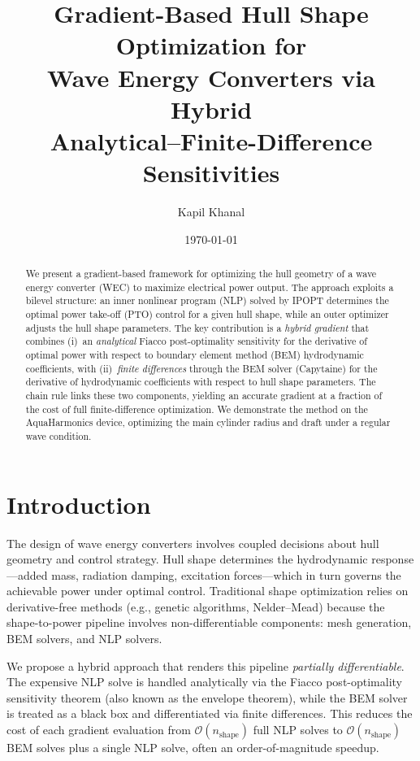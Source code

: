 \documentclass[11pt,a4paper]{article}
\title{Gradient-Based Hull Shape Optimization for \\
       Wave Energy Converters via Hybrid \\
       Analytical--Finite-Difference Sensitivities}
\author{Kapil Khanal}
\date{\today}
\begin{document}
\maketitle

\begin{abstract}
We present a gradient-based framework for optimizing the hull geometry
of a wave energy converter (WEC) to maximize electrical power output.
The approach exploits a bilevel structure: an inner nonlinear program
(NLP) solved by IPOPT determines the optimal power take-off (PTO)
control for a given hull shape, while an outer optimizer adjusts the
hull shape parameters.  The key contribution is a \emph{hybrid gradient}
that combines (i)~an \emph{analytical} Fiacco post-optimality sensitivity
for the derivative of optimal power with respect to boundary element
method (BEM) hydrodynamic coefficients, with (ii)~\emph{finite differences}
through the BEM solver (Capytaine) for the derivative of hydrodynamic
coefficients with respect to hull shape parameters.  The chain rule
links these two components, yielding an accurate gradient at a fraction
of the cost of full finite-difference optimization.  We demonstrate the
method on the AquaHarmonics device, optimizing the main cylinder radius
and draft under a regular wave condition.
\end{abstract}

\tableofcontents
\newpage

\section{Introduction}
\label{sec:intro}

The design of wave energy converters involves coupled decisions about
hull geometry and control strategy.  Hull shape determines the
hydrodynamic response---added mass, radiation damping, excitation
forces---which in turn governs the achievable power under optimal
control.  Traditional shape optimization relies on derivative-free
methods (e.g., genetic algorithms, Nelder--Mead) because the
shape-to-power pipeline involves non-differentiable components:
mesh generation, BEM solvers, and NLP solvers.

We propose a hybrid approach that renders this pipeline
\emph{partially differentiable}.  The expensive NLP solve is handled
analytically via the Fiacco post-optimality sensitivity theorem
(also known as the envelope theorem), while the BEM solver is
treated as a black box and differentiated via finite differences.
This reduces the cost of each gradient evaluation from
$\mathcal{O}(n_{\text{shape}})$ full NLP solves to
$\mathcal{O}(n_{\text{shape}})$ BEM solves plus a single NLP solve,
often an order-of-magnitude speedup.
\end{document}
